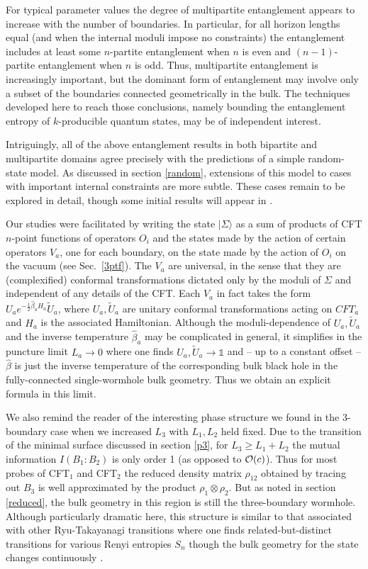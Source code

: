 \documentclass[12pt]{article}
\numberwithin{equation}{section}
\begin{document}
For typical parameter values the degree of multipartite entanglement appears to increase with the number of boundaries. In particular, for all horizon lengths equal (and when the internal moduli impose no constraints) the entanglement includes at least some $n$-partite entanglement when $n$ is even and $(n-1)$-partite entanglement when $n$ is odd.  Thus, multipartite entanglement is increasingly important, but the dominant form of entanglement may involve only a subset of the boundaries connected geometrically in the bulk. The techniques developed here to reach those conclusions, namely bounding the entanglement entropy of $k$-producible quantum states, may be of independent interest.

Intriguingly, all of the above entanglement results in both bipartite and multipartite domains agree precisely with the predictions of a simple random-state model.  As discussed in section \ref{random}, extensions of this model to cases with important internal constraints are more subtle.  These cases remain to be explored in detail, though some initial results will appear in \cite{hayden2014random}.

Our studies were facilitated by writing the state $|\Sigma \rangle$ as a sum of products of  CFT $n$-point functions of operators $O_i$ and the states made by the action of certain operators $V_a$, one for each boundary, on the state made by the action of $O_i $ on the %
vacuum (see Sec.~\ref{3ptf}).
The $V_a$ are universal, in the sense that they are (complexified) conformal transformations dictated only by the moduli of $\Sigma$ and independent of any details of the CFT.  Each $V_a$ in fact takes the form $U_a e^{-\frac{1}{2} \hat \beta_a H_a} \tilde U_a$, where $U_a, \tilde U_a$ are unitary conformal transformations acting on $CFT_a$ and $H_a$ is the associated Hamiltonian.  Although the moduli-dependence of $U_a, \tilde U_a$ and the inverse temperature $\hat \beta_a$ may be complicated in general, it simplifies in the puncture limit $L_a \rightarrow 0$ where one finds $U_a, \tilde U_a \rightarrow \mathds{1}$ and -- up to a constant offset -- $\hat \beta$ is just the inverse temperature of the corresponding bulk black hole in the fully-connected single-wormhole bulk geometry.  Thus we obtain an explicit formula in this limit.

We also remind the reader of the interesting phase structure we found in the 3-boundary case when we increased $L_3$ with $L_1,L_2$ held fixed.  Due to the transition of the minimal surface discussed in section \ref{p3}, for  $L_3 \ge L_1+L_2$ the mutual information $I(B_1:B_2)$  is only order 1 (as opposed to ${\cal O}(c)$).  Thus for most probes of CFT${}_1$ and CFT${}_2$ the reduced density matrix $\rho_{12}$ obtained by tracing out $B_3$ is well approximated by the product $\rho_1 \otimes \rho_2$. But as noted in section \ref{reduced}, the bulk geometry in this region is still the three-boundary wormhole. Although particularly dramatic here, this structure is similar to that associated with other Ryu-Takayanagi transitions where one finds related-but-distinct transitions for various Renyi entropies $S_n$ though the bulk geometry for the state changes continuously \cite{Faulkner:2013yia}.
\end{document}
